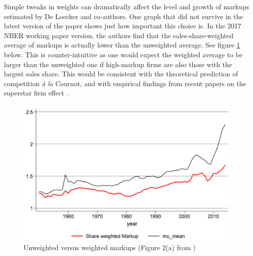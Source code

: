 \documentclass{amsart}
\theoremstyle{definition}
\theoremstyle{remark}
\numberwithin{equation}{section}
\begin{document}

Simple tweaks in weights can dramatically affect the level and growth of markups estimated by De Loecker and co-authors. One graph that did not survive in the latest version of the paper shows just how important this choice is. In the 2017 NBER working paper version, the authors find that the sales-share-weighted average of markups is actually lower than the unweighted average. See figure \ref{fig:unweighted} below. This is counter-intuitive as one would expect the weighted average to be larger than the unweighted one if high-markup firms are also those with the largest sales share. This would be consistent with the theoretical prediction of competition \textit{\`a la} Cournot, and with empirical findings from recent papers on the superstar firm effect \citep{autor2019fall}.

\begin{figure}[h!]
    \includegraphics[width=0.8 \textwidth]{unweighted_markups.PNG}
    \caption{Unweighted versus weighted markups (Figure 2(a) from \cite{deloecker2017rise})}
    \label{fig:unweighted}
\end{figure}
\end{document}
